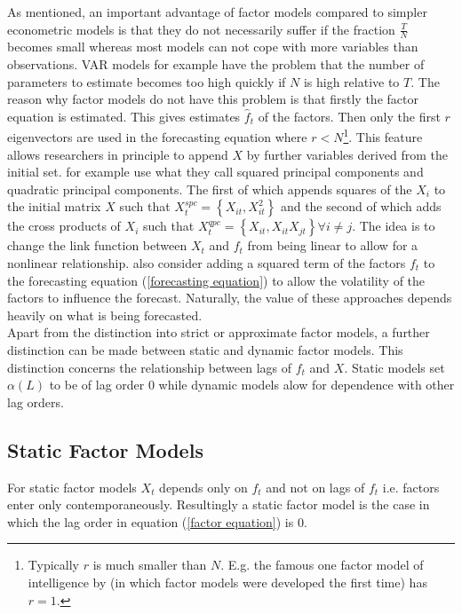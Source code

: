 \documentclass[12pt]{article}
\begin{document}
As mentioned, an important advantage of factor models compared to simpler econometric models is that they do not necessarily suffer if the fraction $\frac{T}{N}$ becomes small whereas most models can not cope with more variables than observations. VAR models for example have the problem that the number of parameters to estimate becomes too high quickly if $N$ is high relative to $T$. 
The reason why factor models do not have this problem is that firstly the factor equation is estimated. This gives estimates $\hat f_t$ of the factors. Then only the first $r$ eigenvectors are used in the forecasting equation where $r<N$\footnote{Typically $r$ is much smaller than $N$. E.g. the famous one factor model of intelligence by \citet{spearman1904general} (in which factor models were developed the first time) has $r=1$.}. This feature allows researchers in principle to append $X$ by further variables derived from the initial set. \citet{bai2008forecasting} for example use what they call squared principal components and quadratic principal components. The first of which appends squares of the $X_i$ to the initial matrix $X$ such that $X_{t}^{spc}=\left\{X_{it}, X_{it}^2\right\}$ and the second of which adds the cross products of $X_i$ such that $X_t^{qpc} = \left\{ X_{it}, X_{it} X_{jt}\right\} \forall i \not= j$. The idea is to change the link function between $X_t$ and $f_t$ from being linear to allow for a nonlinear relationship. \citet{bai2008forecasting} also consider adding a squared term of the factors $f_t$ to the forecasting equation (\ref{forecasting equation}) to allow the volatility of the factors to influence the forecast. Naturally, the value of these approaches depends heavily on what is being forecasted. \\

Apart from the distinction into strict or approximate factor models, a further distinction can be made between static and dynamic factor models. This distinction concerns the relationship between lags of $f_t$ and $X$. Static models set $\alpha(L)$ to be of lag order $0$ while dynamic models alow for dependence with other lag orders.


\subsection{Static Factor Models}
For static factor models $X_t$ depends only on $f_t$ and not on lags of $f_t$ i.e. factors enter only contemporaneously. Resultingly a static factor model is the case in which the lag order in equation (\ref{factor equation}) is 0.
\end{document}

